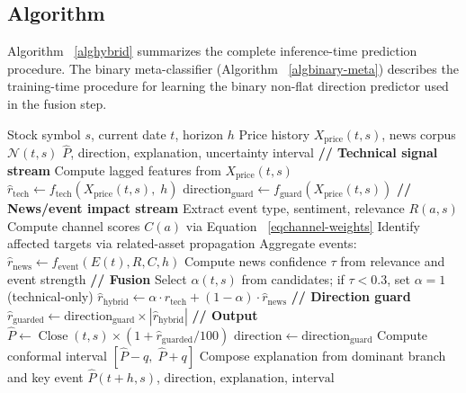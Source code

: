 \documentclass[runningheads]{llncs}
\begin{document}
\subsection{Algorithm}
\label{secalgorithm}

Algorithm~
\ref{alghybrid} summarizes the complete inference-time prediction procedure. The binary meta-classifier (Algorithm~
\ref{algbinary-meta}) describes the training-time procedure for learning the binary non-flat direction predictor used in the fusion step.

\begin{algorithm}[H]
\caption{Multimodal Event-Aware Hybrid Prediction (Inference)}
\label{alghybrid}
\begin{algorithmic}[1]
\REQUIRE Stock symbol $s$, current date $t$, horizon $h$
\REQUIRE Price history $X_{\mathrm{price}}(t, s)$, news corpus $\mathcal{N}(t, s)$
\ENSURE $\widehat{P}$, direction, explanation, uncertainty interval
\STATE \textbf{// Technical signal stream}
\STATE Compute lagged features from $X_{\mathrm{price}}(t, s)$
\STATE $\hat{r}_{\mathrm{tech}} \gets f_{\mathrm{tech}}(X_{\mathrm{price}}(t, s),\; h)$
\STATE $\text{direction}_{\mathrm{guard}} \gets f_{\mathrm{guard}}(X_{\mathrm{price}}(t, s))$
\STATE \textbf{// News/event impact stream}
  \STATE Extract event type, sentiment, relevance $R(a, s)$
  \STATE Compute channel scores $C(a)$ via Equation~
\ref{eqchannel-weights}
  \STATE Identify affected targets via related-asset propagation
\ENDFOR
\STATE Aggregate events: $\hat{r}_{\mathrm{news}} \gets f_{\mathrm{event}}(E(t), R, C, h)$
\STATE Compute news confidence $\tau$ from relevance and event strength
\STATE \textbf{// Fusion}
\STATE Select $\alpha(t, s)$ from candidates; if $\tau < 0.3$, set $\alpha = 1$ (technical-only)
\STATE $\hat{r}_{\mathrm{hybrid}} \gets \alpha \cdot \hat{r}_{\mathrm{tech}} + (1-\alpha) \cdot \hat{r}_{\mathrm{news}}$
\STATE \textbf{// Direction guard}
\STATE $\hat{r}_{\mathrm{guarded}} \gets \text{direction}_{\mathrm{guard}} \times |\hat{r}_{\mathrm{hybrid}}|$
\STATE \textbf{// Output}
\STATE $\widehat{P} \gets \operatorname{Close}(t, s) \times (1 + \hat{r}_{\mathrm{guarded}} / 100)$
\STATE $\text{direction} \gets \text{direction}_{\mathrm{guard}}$
\STATE Compute conformal interval $[\widehat{P} - q,\; \widehat{P} + q]$
\STATE Compose explanation from dominant branch and key event
\RETURN $\hat{P}(t+h,s)$, $\text{direction}$, $\text{explanation}$, $\text{interval}$
\end{algorithmic}
\end{algorithm}
\end{document}
